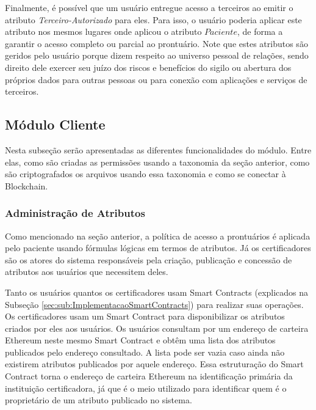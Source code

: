\documentclass[a4paper,11pt]{article}
\begin{document}

Finalmente, é possível que um usuário entregue acesso a terceiros ao emitir o atributo \textit{Terceiro-Autorizado} para eles. Para isso, o usuário poderia aplicar este atributo nos mesmos lugares onde aplicou o atributo $Paciente$, de forma a garantir o acesso completo ou parcial ao prontuário. %
Note que estes atributos são geridos pelo usuário porque dizem respeito ao universo pessoal de relações, sendo direito dele exercer seu juízo dos riscos e benefícios do sigilo ou abertura dos próprios dados para outras pessoas ou para conexão com aplicações e serviços de terceiros.

\subsection{Módulo Cliente}

Nesta subseção serão apresentadas as diferentes funcionalidades do módulo. Entre elas, como são criadas as permissões usando a taxonomia da seção anterior, como são criptografados os arquivos usando essa taxonomia e como se conectar à Blockchain.

\subsubsection{Administração de Atributos}
\label{sec:sub:administracao-permissoes}

Como mencionado na seção anterior, a política de acesso a prontuários é aplicada pelo paciente usando fórmulas lógicas em termos de atributos.
Já os certificadores são os atores do sistema responsáveis pela criação, publicação e concessão de atributos aos usuários que necessitem deles. %

Tanto os usuários quantos os certificadores usam Smart Contracts (explicados na Subseção \ref{sec:sub:ImplementacaoSmartContracts}) para realizar suas operações. Os certificadores usam um Smart Contract para disponibilizar os atributos criados por eles aos usuários.
Os usuários consultam por um endereço de carteira Ethereum neste mesmo Smart Contract e obtêm uma lista dos atributos publicados pelo endereço consultado. A lista pode ser vazia caso ainda não existirem atributos publicados por aquele endereço.
Essa estruturação do Smart Contract torna o endereço de carteira Ethereum na identificação primária da instituição certificadora, já que é o meio utilizado para identificar quem é o proprietário de um atributo publicado no sistema.
\end{document}
